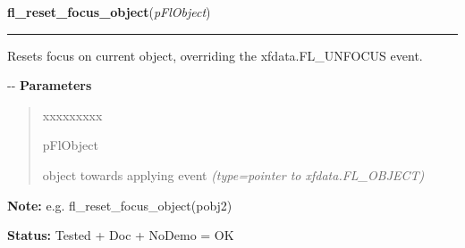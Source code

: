 \hspace{.8\funcindent}\begin{boxedminipage}{\funcwidth}

    \raggedright \textbf{fl\_reset\_focus\_object}(\textit{pFlObject})

    \vspace{-1.5ex}

    \rule{\textwidth}{0.5\fboxrule}
\setlength{\parskip}{2ex}

Resets focus on current object, overriding the xfdata.FL\_UNFOCUS
event.

-{}-
\setlength{\parskip}{1ex}
      \textbf{Parameters}
      \vspace{-1ex}

      \begin{quote}
        \begin{Ventry}{xxxxxxxxx}

          \item[pFlObject]


object towards applying event
            {\it (type=pointer to xfdata.FL\_OBJECT)}

        \end{Ventry}

      \end{quote}

\textbf{Note:} 
e.g. fl\_reset\_focus\_object(pobj2)


\textbf{Status:} 
Tested + Doc + NoDemo = OK


    \end{boxedminipage}

    \label{xformslib:flbasic:fl_set_form_atclose}

    \vspace{0.5ex}

